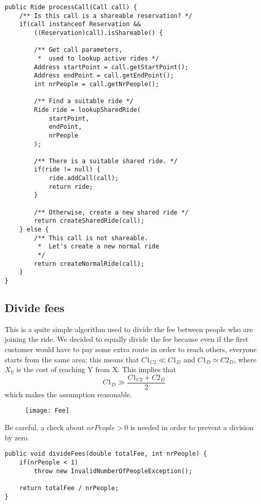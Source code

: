\begin{lstlisting}[caption={processCall()}]
public Ride processCall(Call call) {
    /** Is this call is a shareable reservation? */
    if(call instanceof Reservation && 
        ((Reservation)call).isShareable() {

        /** Get call parameters, 
         *  used to lookup active rides */
        Address startPoint = call.getStartPoint();
        Address endPoint = call.getEndPoint();
        int nrPeople = call.getNrPeople();

        /** Find a suitable ride */
        Ride ride = lookupSharedRide(
            startPoint, 
            endPoint, 
            nrPeople
        );

        /** There is a suitable shared ride. */
        if(ride != null) {
            ride.addCall(call);
            return ride;
        }
        
        /** Otherwise, create a new shared ride */
        return createSharedRide(call);
    } else {
        /** This call is not shareable. 
         *  Let's create a new normal ride
         */
        return createNormalRide(call); 
    }
}
\end{lstlisting}
\pagebreak
\subsection{Divide fees}
This is a quite simple algorithm used to divide the fee between 
people who are joining the ride. We decided to equally divide the fee
because even if the first customer would have to pay some extra route
in order to reach others, everyone starts from the same area; this means
that $C1_{C2} \ll C1_D$ and $C1_D \simeq C2_D$, where $X_Y$ is the cost of reaching Y from X. This implies that
\begin{equation}
    C1_D \gg \frac{C1_{C2} + C2_D}{2}
\end{equation}
which makes the assumption reasonable.

\begin{figure}[h!]
    \centering
    \texttt{[image: Fee]}
\end{figure}

Be careful, a check about $ nrPeople > 0 $ is needed in order to prevent
a division by zero.

\begin{lstlisting}[caption={Divide fees between partecipants}]
public void divideFees(double totalFee, int nrPeople) {
    if(nrPeople < 1)
        throw new InvalidNumberOfPeopleException();

    return totalFee / nrPeople;
}
\end{lstlisting}
